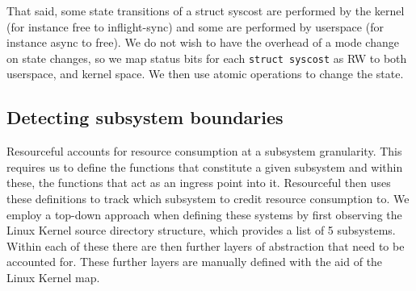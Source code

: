 \documentclass[12pt]{article}
\def\_{\textunderscore\-}
\begin{document}
\begin{description}
  That said, some state transitions of a struct sys\_cost are performed by the kernel (for instance free to inflight-sync) and some are performed by userspace (for instance async to free). We do not wish to have the overhead of a mode change on state changes, so we map status bits for each \texttt{struct sys\_cost} as RW to both userspace, and kernel space. We then use atomic operations to change the state.

  \end{description}

  \subsection{Detecting subsystem boundaries}
  Resourceful accounts for resource consumption at a subsystem granularity.
  This requires us to define the functions that constitute a given subsystem and within these, the functions that act as an ingress point into it.
  Resourceful then uses these definitions to track which subsystem to credit resource consumption to.
  We employ a top-down approach when defining these systems by first observing the Linux Kernel source directory structure, which provides a list of 5 subsystems. Within each of these there are then further layers of abstraction that need to be accounted for. These further layers are manually defined with the aid of the Linux Kernel map.
\end{document}

